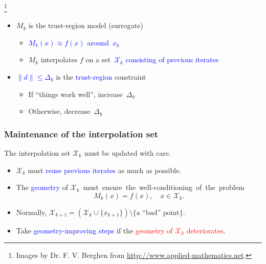 \documentclass[slidestop,mathserif,xcolor=dvipsnames]{beamer}
\newcommand\blfootnote[1]{%
  \begingroup
  \renewcommand\thefootnote{}\footnote{#1}%
  \addtocounter{footnote}{-1}%
  \endgroup
}
\newcommand{\blue}[1]{\textcolor{blue}{#1}}
\newcommand{\red}[1]{\textcolor{red}{#1}}
\begin{document}
\begin{frame}
\begin{beamerboxesrounded}[width=7cm,shadow=true]{}
\begin{equation*}
    \end{equation*}
    \end{beamerboxesrounded}
    \blfootnote{Images by Dr. F. V. Berghen from \url{http://www.applied-mathematics.net}.}
    \vspace{0.2ex}
\begin{itemize}
  \item $M_k$ is the trust-region model  (surrogate)
    \begin{itemize}
        \item \blue{$M_k(x)\approx f(x)$ around~$x_k$}
      \item  $M_k$ interpolates $f$ on a set~\blue{$\mathcal{X}_k$ consisting of previous iterates}
    \end{itemize}
\vspace{0.6ex}
  \item \blue{$\|d\|\le\Delta_k$} is the \blue{trust-region} constraint
      \begin{itemize}
          \item If ``things work well'', increase~$\Delta_k$
          \item Otherwise, decrease~$\Delta_k$
          \end{itemize}
\end{itemize}

\end{frame}


\begin{frame}
    \frametitle{Maintenance of the interpolation set}
    \vspace{2ex}
    The interpolation set $\mathcal{X}_k$ must be updated with care.
    \vspace{1ex}
    \begin{itemize}
        \item $\mathcal{X}_k$ must \blue{reuse previous iterates} as much as possible.
    \vspace{1ex}
\item The \blue{geometry} of \mbox{$\mathcal{X}_k$ must ensure the well-conditioning of~the~problem}
            \[
                M_k(x) = f(x), \quad x \in \mathcal{X}_k.
            \]
\item Normally, $\mathcal{X}_{k+1} = \left(\mathcal{X}_{k}\cup\{x_{k+1}\}\right) \setminus\{\text{a ``bad'' point}\}$.
    \vspace{1ex}
\item Take \blue{geometry-improving steps} if the \red{geometry of $\mathcal{X}_k$ deteriorates}.
    \end{itemize}
\end{frame}
\end{document}
